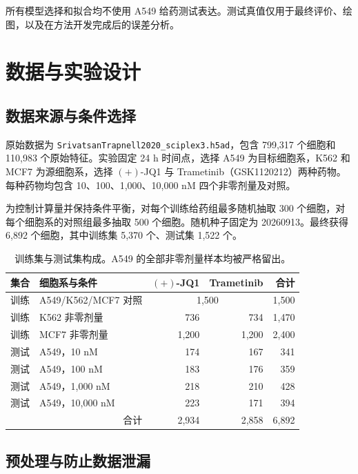 \documentclass[UTF8,11pt,a4paper,fontset=fandol]{ctexart}
\begin{document}
所有模型选择和拟合均不使用 A549 给药测试表达。测试真值仅用于最终评价、绘图，以及在方法开发完成后的误差分析。

\section{数据与实验设计}

\subsection{数据来源与条件选择}

原始数据为 \texttt{SrivatsanTrapnell2020\_sciplex3.h5ad}，包含 799,317 个细胞和 110,983 个原始特征。实验固定 24 h 时间点，选择 A549 为目标细胞系，K562 和 MCF7 为源细胞系，选择 $(+)$-JQ1 与 Trametinib（GSK1120212）两种药物。每种药物均包含 10、100、1,000、10,000 nM 四个非零剂量及对照。

为控制计算量并保持条件平衡，对每个训练给药组最多随机抽取 300 个细胞，对每个细胞系的对照组最多抽取 500 个细胞。随机种子固定为 20260913。最终获得 6,892 个细胞，其中训练集 5,370 个、测试集 1,522 个。

\begin{table}[H]
\centering
\caption{训练集与测试集构成。A549 的全部非零剂量样本均被严格留出。}
\label{tab:split}
\begin{tabular}{llrrr}
\toprule
集合 & 细胞系与条件 & $(+)$-JQ1 & Trametinib & 合计 \\
\midrule
训练 & A549/K562/MCF7 对照 & \multicolumn{2}{c}{1,500} & 1,500 \\
训练 & K562 非零剂量 & 736 & 734 & 1,470 \\
训练 & MCF7 非零剂量 & 1,200 & 1,200 & 2,400 \\
\midrule
测试 & A549，10 nM & 174 & 167 & 341 \\
测试 & A549，100 nM & 183 & 176 & 359 \\
测试 & A549，1,000 nM & 218 & 210 & 428 \\
测试 & A549，10,000 nM & 223 & 171 & 394 \\
\midrule
\multicolumn{2}{r}{合计} & 2,934 & 2,858 & 6,892 \\
\bottomrule
\end{tabular}
\end{table}

\subsection{预处理与防止数据泄漏}
\end{document}
